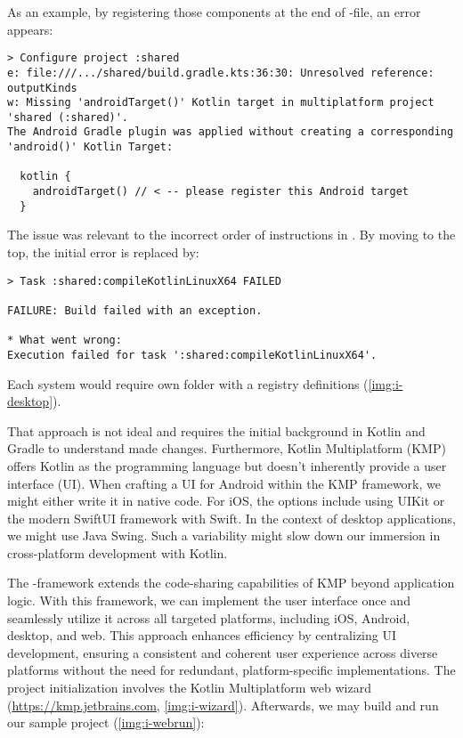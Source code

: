 As an example, by registering those components at the end of -file, an error appears:

\begin{lstlisting}[language=terminal]
> Configure project :shared
e: file:///.../shared/build.gradle.kts:36:30: Unresolved reference: outputKinds
w: Missing 'androidTarget()' Kotlin target in multiplatform project 'shared (:shared)'.
The Android Gradle plugin was applied without creating a corresponding 'android()' Kotlin Target:

  kotlin {
    androidTarget() // < -- please register this Android target
  }
\end{lstlisting}

\noindent The issue was relevant to the incorrect order of instructions in . By moving 
 to the top, the initial error is replaced by:

\begin{lstlisting}[language=terminal]
> Task :shared:compileKotlinLinuxX64 FAILED

FAILURE: Build failed with an exception.

* What went wrong:
Execution failed for task ':shared:compileKotlinLinuxX64'.
\end{lstlisting}

\noindent Each system would require own folder with a registry definitions \cite{Resa22} (\cref{img:i-desktop}).


\noindent That approach is not ideal and requires the initial background in Kotlin and Gradle to understand made changes. 
Furthermore, Kotlin Multiplatform (KMP) offers Kotlin as the programming language but doesn't inherently provide a user 
interface (UI). When crafting a UI for Android within the KMP framework, we might either write it in native code. For 
iOS, the options include using UIKit or the modern SwiftUI framework with Swift. In the context of desktop applications, 
we might use Java Swing. Such a variability might slow down our immersion in cross-platform development with Kotlin.


\noindent The -framework \cite{JetB23} extends the code-sharing capabilities of KMP beyond 
application logic. With this framework, we can implement the user interface once and seamlessly utilize it across all 
targeted platforms, including iOS, Android, desktop, and web. This approach enhances efficiency by centralizing UI 
development, ensuring a consistent and coherent user experience across diverse platforms without the need for redundant, 
platform-specific implementations. The project initialization involves the Kotlin Multiplatform web wizard
(\href{https://kmp.jetbrains.com}{https://kmp.jetbrains.com}, \cref{img:i-wizard}). Afterwards, we may build and run 
our sample project (\cref{img:i-webrun}):

